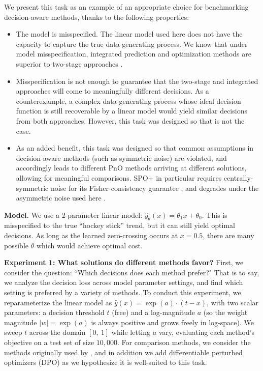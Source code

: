 We present this task as an example of an appropriate choice for benchmarking decision-aware methods, thanks to the following properties:
\begin{itemize}
    \item The model is misspecified. The linear model used here does not have the capacity to capture the true data generating process. We know that under model misspecification, integrated prediction and optimization methods are superior to two-stage approaches \citep{elmachtoubDissectingImpactModel2025}.
    \item Misspecification is not enough to guarantee that the two-stage and integrated approaches will come to meaningfully different decisions. As a counterexample, a complex data-generating process whose ideal decision function is still recoverable by a linear model would yield similar decisions from both approaches. However, this task was designed so that is not the case.
    \item As an added benefit, this task was designed so that common assumptions in decision-aware methods (such as symmetric noise) are violated, and accordingly leads to different PnO methods arriving at different solutions, allowing for meaningful comparisons. SPO+ in particular requires centrally-symmetric noise for its Fisher-consistency guarantee \citep{elmachtoubSmartPredictThen2022}, and degrades under the asymmetric noise used here \citep{huang2024decisionfocusedPG}.
\end{itemize}

\textbf{Model.} We use a 2-parameter linear model: $\hat{y}_{\theta}(x) = \theta_1 x + \theta_0$. This is misspecified to the true ``hockey stick'' trend, but  it can still yield optimal decisions. As long as the learned zero-crossing occurs at $x=0.5$, there are many possible $\theta$ which would achieve optimal cost.

\textbf{Experiment 1: What solutions do different methods favor?} First, we consider the question: ``Which decisions does each method prefer?" That is to say, we analyze the decision loss across model parameter settings, and find which setting is preferred by a variety of methods. To conduct this experiment, we reparameterize the linear model as $\hat{y}(x) = \exp(a) \cdot (t - x)$, with two scalar parameters: a decision threshold $t$ (free) and a log-magnitude $a$ (so the weight magnitude $|w|=\exp(a)$ is always positive and grows freely in log-space). We sweep $t$ across the domain $[0,\ 1]$ while letting $a$ vary, evaluating each method's objective on a test set of size $10,000$. For comparison methods, we consider the methods originally used by \citeauthor{huang2024decisionfocusedPG}, and in addition we add differentiable perturbed optimizers (DPO) as we hypothesize it is well-suited to this task.

